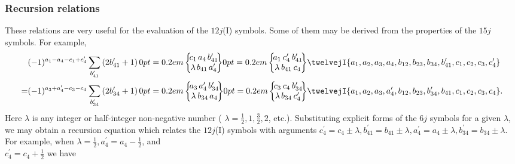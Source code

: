 \subsubsection{Recursion relations}
These relations are very useful for the evaluation of the $12j$(I) symbols. Some of them may be derived from the properties of the $15 j$ symbols. For example,
\begin{align}
& (-1)^{a_{1}-a_{4}-c_{1}+c_{4}^{\prime}} \sum_{b_{41}^{\prime}}\left(2 b_{41}^{\prime}+1\right)\sixj{c_{1}}{a_{4}}{b_{41}^{\prime}}{\lambda}{b_{41}}{a_{4}^{\prime}}\sixj{a_{1}}{c_{4}^{\prime}}{b_{41}^{\prime}}{\lambda}{b_{41}}{c_{4}}\twelvejI{a_{1},a_{2},a_{3},a_{4},b_{12},b_{23},b_{34},b_{41}^{\prime},c_{1},c_{2},c_{3},c_{4}^{\prime}}  \notag\\
= & (-1)^{a_{3}+a_{4}^{\prime}-c_{3}-c_{4}} \sum_{b_{34}^{\prime}}\left(2 b_{34}^{\prime}+1\right)\sixj{a_{3}}{a_{4}^{\prime}}{b_{34}^{\prime}}{\lambda}{b_{34}}{a_{4}}\sixj{c_{3}}{c_{4}}{b_{34}^{\prime}}{\lambda}{b_{34}}{c_{4}^{\prime}}\twelvejI{a_{1},a_{2},a_{3},a_{4}^{\prime},b_{12},b_{23},b_{34}^{\prime},b_{41},c_{1},c_{2},c_{3},c_{4}} . \label{eq:10:13:10}
\end{align}
Here $\lambda$ is any integer or half-integer non-negative number ( $\lambda=\frac{1}{2}, 1, \frac{3}{2}, 2$, etc.). Substituting explicit forms of the $6 j$ symbols for a given $\lambda$, we may obtain a recursion equation which relates the $12j$(I) symbols with arguments $c_{4}^{\prime}=c_{4} \pm \lambda, b_{41}^{\prime}=b_{41} \pm \lambda, a_{4}^{\prime}=a_{4} \pm \lambda, b_{34}^{\prime}=b_{34} \pm \lambda$. For example, when $\lambda=\frac{1}{2}, a_{4}^{\prime}=a_{4}-\frac{1}{2}$, and\\
$c_{4}^{\prime}=c_{4}+\frac{1}{2}$ we have
